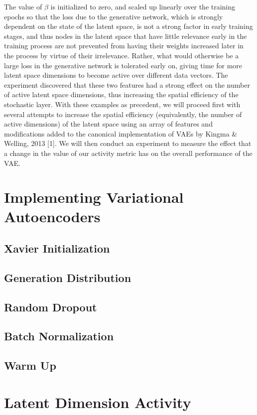 \documentclass{article} %
\begin{document}
The value of $\beta$ is initialized to zero, and scaled up linearly over the training epochs so that the loss due to the generative network, which is strongly dependent on the state of the latent space, is not a strong factor in early training stages, and thus nodes in the latent space that have little relevance early in the training process are not prevented from having their weights increased later in the process by virtue of their irrelevance. Rather, what would otherwise be a large loss in the generative network is tolerated early on, giving time for more latent space dimensions to become active over different data vectors. The experiment discovered that these two features had a strong effect on the number of active latent space dimensions, thus increasing the spatial efficiency of the stochastic layer.
With these examples as precedent, we will proceed first with several attempts to increase the spatial efficiency (equivalently, the number of active dimensions) of the latent space using an array of features and modifications added to the canonical implementation of VAEs by Kingma \& Welling, 2013 [1]. We will then conduct an experiment to measure the effect that a change in the value of our activity metric has on the overall performance of the VAE.
\section{Implementing Variational Autoencoders}
\subsection{Xavier Initialization}
\subsection{Generation Distribution}
\subsection{Random Dropout}
\subsection{Batch Normalization}
\subsection{Warm Up}

\section{Latent Dimension Activity}
\end{document}

